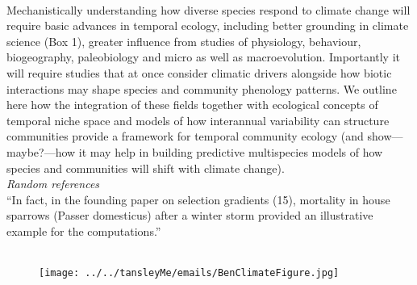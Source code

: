 \documentclass[11pt,a4paper]{article}
\begin{document}
\\
Mechanistically understanding how diverse species respond to climate change will require basic advances in temporal ecology, including better grounding in climate science (Box 1), greater influence from studies of physiology, behaviour, biogeography, paleobiology and micro as well as macroevolution. Importantly it will require studies that at once consider climatic drivers alongside how biotic interactions may shape species and community phenology patterns. We outline here how the integration of these fields together with ecological concepts of temporal niche space and models of how interannual variability can structure communities provide a framework for temporal community ecology (and show---maybe?---how it may help in building predictive multispecies models of how species and communities will shift with climate change).\\

\newpage
\noindent \emph{Random references}\\

``In fact, in the founding paper on selection
gradients (15), mortality in house sparrows (Passer
domesticus) after a winter storm provided an illustrative
example for the computations.'' \citep{schoener2011}\\
\\
\begin{footnotesize}
{\def\section*#1{}

}
\end{footnotesize}

\begin{figure}[h!]
\centering
\noindent \texttt{[image: ../../tansleyMe/emails/BenClimateFigure.jpg]}
\end{figure}
\end{document}

